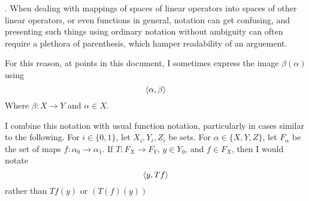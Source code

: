 \begin{prop}
\label{rmk:linearoperatornotation}
    $.$
    When dealing with mappings of 
    spaces of linear operators into
    spaces of other linear operators, 
    or even functions in general, 
    notation can get confusing, and
    presenting such things using ordinary notation without
    ambiguity can often require a plethora of parenthesis, 
    which hamper readability of an arguement. 

    For this reason, at points in this document, 
    I sometimes express the image $\beta(\alpha)$ using 
    \begin{equation*}
        \left\langle \alpha, \beta \right\rangle
    \end{equation*}
    Where $\beta:X \to Y$ 
    and $\alpha \in X$. 

    I combine this notation with usual function notation, 
    particularly in cases similar to the following. 
    For $i \in \{0,1\}$, 
    let $X_i, Y_i, Z_i$ be sets. 
    For $\alpha \in \{X,Y,Z\}$, let 
    $F_\alpha$ be the set of maps $f:\alpha_0 \to \alpha_1$. 
    If $T:F_X \to F_Y$, 
    $y \in Y_0$, 
    and $f \in F_X$, then I would notate
    \begin{equation*}
        \left\langle y, Tf \right\rangle
    \end{equation*}
    rather than $Tf(y)$ or $(T(f)(y))$
\end{prop}
